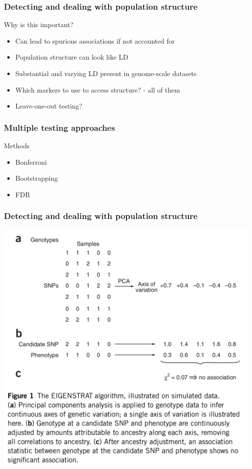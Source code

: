 \begin{frame}
\frametitle{Detecting and dealing with population structure}
\begin{block}{Why is this important?}
\begin{itemize}
	\item{Can lead to spurious associations if not accounted for}
	\item{Population structure can look like LD}
	\item{Substantial and varying LD present in genome-scale datasets}
	\item{Which markers to use to access structure? - all of them}
	\item{Leave-one-out testing?}
\end{itemize}
\end{block}
\tiny
\citet{Price:2006cd}
\end{frame}

\begin{frame}
\frametitle{Multiple testing approaches}
\begin{block}{Methods}
\begin{itemize}
	\item Bonferroni
	\item Bootstrapping
	\item FDR
\end{itemize}
\end{block}
\end{frame}

\begin{frame}
\frametitle{Detecting and dealing with population structure}
\begin{block}{}
\centering
\includegraphics[height=0.8\textheight]{price.png}\\
\tiny
\citet[Figure 1]{Price:2006cd}
\end{block}
\end{frame}

